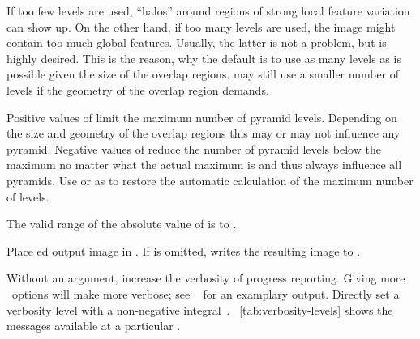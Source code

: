 \begin{codelist}
\begin{geeknote}
    If too few levels are used, ``halos'' around regions of strong local feature variation can
    show up.  On the other hand, if too many levels are used, the image might contain too much
    global features.  Usually, the latter is not a problem, but is highly desired.  This is the
    reason, why the default is to use as many levels as is possible given the size of the
    overlap regions.  \App{} may still use a smaller number of levels if the geometry of the
    overlap region demands.
  \end{geeknote}

  Positive values of  limit the maximum number of pyramid levels.  Depending on
  the size and geometry of the overlap regions this may or may not influence any pyramid.
  Negative values of  reduce the number of pyramid levels below the maximum no
  matter what the actual maximum is and thus always influence all pyramids.  Use 
  or  as  to restore the automatic calculation of the maximum
  number of levels.

  The valid range of the absolute value of  is 
  to .

  \label{opt:output}%
\item[\itempar{-o \metavar{FILE} \\ --output=\metavar{FILE}}]\itemend
  Place \appdoes{}ed output image in .  If  is omitted, \App{}
  writes the resulting image to %
  .


  \label{opt:verbose}%
\item[\itempar{-v \optional{\metavar{LEVEL}} \\ --verbose\optional{=\metavar{LEVEL}}}]\itemend
  Without an argument, increase the verbosity of progress reporting.  Giving more
  ~options will make \App{} more verbose; see
  \sectionName~ for an examplary output.  Directly set a
  verbosity level with a non-negative integral~.
  \tableName~\ref{tab:verbosity-levels} shows the messages available at a particular
  .


\end{codelist}
